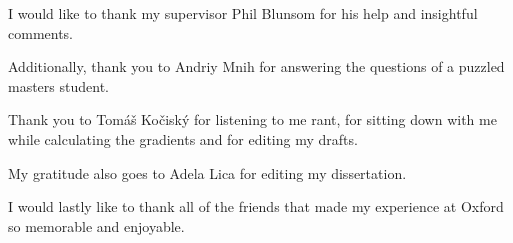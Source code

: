 \begin{acknowledgements}

I would like to thank my supervisor Phil Blunsom for his help and insightful comments.

Additionally, thank you to Andriy Mnih for answering the questions of a puzzled masters student.

Thank you to Tom{\'a}\v{s} Ko\v{c}isk{\'y} for listening to me rant, for sitting down with me while calculating the gradients and for editing my drafts. 

My gratitude also goes to Adela Lica for editing my dissertation.

I would lastly like to thank all of the friends that made my experience at Oxford so memorable and enjoyable.

\end{acknowledgements}